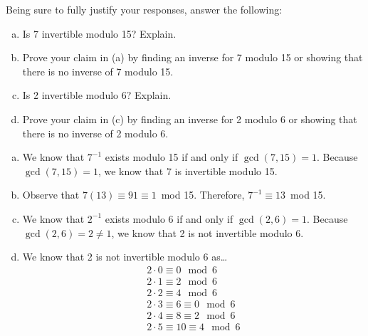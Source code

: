 \documentclass[11pt,letterpaper]{article}
\begin{document}
\newpage



 Being sure to fully justify your responses, answer the following:
	\begin{enumerate}[(a)]
	\item Is 7 invertible modulo 15? Explain. 
	\item Prove your claim in (a) by finding an inverse for 7 modulo 15 or showing that there is no inverse of 7 modulo 15. 
	\item Is 2 invertible modulo 6? Explain.
	\item Prove your claim in (c) by finding an inverse for 2 modulo 6 or showing that there is no inverse of 2 modulo 6.
	\end{enumerate} \pspace

\sol 
\begin{enumerate}[(a)]
\item We know that $7^{-1}$ exists modulo 15 if and only if $\gcd(7, 15)= 1$. Because $\gcd(7, 15)= 1$, we know that 7 is invertible modulo 15. \pspace

\item Observe that $7(13) \equiv 91 \equiv 1$~mod 15. Therefore, $7^{-1} \equiv 13$~mod 15. \pspace

\item We know that $2^{-1}$ exists modulo 6 if and only if $\gcd(2, 6)= 1$. Because $\gcd(2, 6)= 2 \neq 1$, we know that 2 is not invertible modulo 6. \pspace

\item We know that 2 is not invertible modulo 6 as\dots
	\[
	\begin{aligned}
	2 \cdot 0 \equiv 0 \mod 6 \\
	2 \cdot 1 \equiv 2 \mod 6 \\
	2 \cdot 2 \equiv 4 \mod 6 \\
	2 \cdot 3 \equiv 6 \equiv 0 \mod 6 \\
	2 \cdot 4 \equiv 8 \equiv 2 \mod 6 \\
	2 \cdot 5 \equiv 10 \equiv 4 \mod 6
	\end{aligned}
	\]
\end{enumerate}
\end{document}
